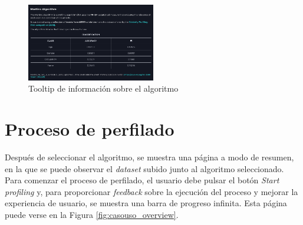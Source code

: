 \begin{figure}[H]
	\centering
	\includegraphics[width=0.5\textwidth]{imagenes/tooltip_only.png}
	\caption{Tooltip de información sobre el algoritmo}
	\label{fig:casouso_tooltip}
\end{figure}

\section{Proceso de perfilado}

Después de seleccionar el algoritmo, se muestra una página a modo de resumen, en la que se puede observar el \textit{dataset} subido
junto al algoritmo seleccionado. Para comenzar el proceso de perfilado, el usuario debe pulsar el botón
\textit{Start profiling} y, para proporcionar \textit{feedback} sobre la ejecución del proceso y mejorar la experiencia de usuario,
se muestra una barra de progreso infinita. Esta página puede verse en la Figura \ref{fig:casouso_overview}.

